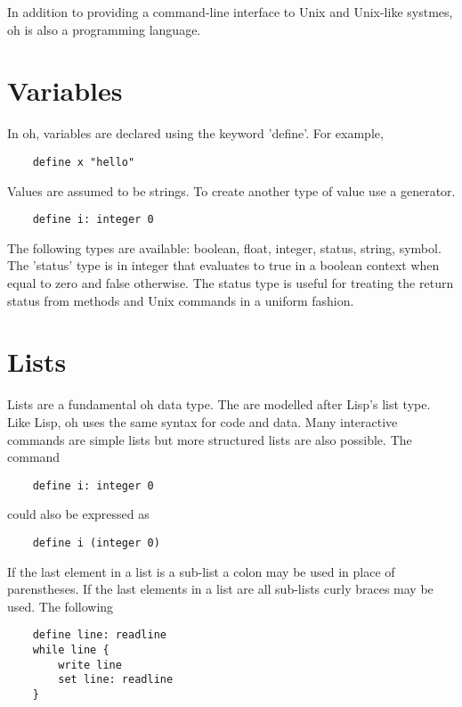 \documentclass[12pt]{book}
\begin{document}
In addition to providing a command-line interface to Unix and
Unix-like systmes, oh is also a programming language.


\section{Variables}

In oh, variables are declared using the keyword 'define'. For example,

\begin{lstlisting}
	define x "hello"
\end{lstlisting}

Values are assumed to be strings. To create another type of value
use a generator.

\begin{lstlisting}
	define i: integer 0
\end{lstlisting}

The following types are available: boolean, float, integer, status,
string, symbol. The 'status' type is in integer that evaluates to
true in a boolean context when equal to zero and false otherwise.
The status type is useful for treating the return status from methods
and Unix commands in a uniform fashion.


\section{Lists}

Lists are a fundamental oh data type. The are modelled after Lisp's
list type. Like Lisp, oh uses the same syntax for code and data.
Many interactive commands are simple lists but more structured lists
are also possible. The command

\begin{lstlisting}
	define i: integer 0
\end{lstlisting}

could also be expressed as

\begin{lstlisting}
	define i (integer 0)
\end{lstlisting}

If the last element in a list is a sub-list a colon may be used in
place of parenstheses. If the last elements in a list are all
sub-lists curly braces may be used. The following

\begin{lstlisting}
	define line: readline
	while line {
		write line
		set line: readline
	}
\end{lstlisting}
\end{document}
